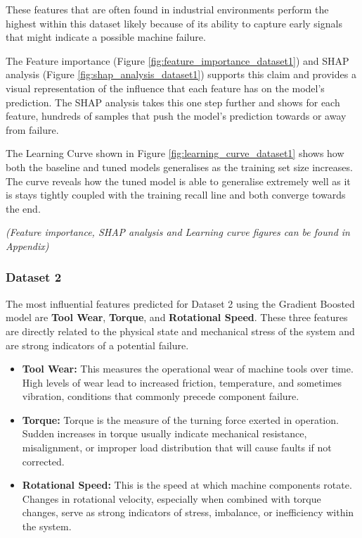 \documentclass[11pt]{article}
\begin{document}
These features that are often found in industrial environments perform the highest within this dataset likely because of its ability to capture early signals that might indicate a possible machine failure.

The Feature importance (Figure \ref{fig:feature_importance_dataset1}) and SHAP analysis (Figure \ref{fig:shap_analysis_dataset1}) supports this claim and provides a visual representation of the influence that each feature has on the model's prediction. The SHAP analysis takes this one step further and shows for each feature, hundreds of samples that push the model's prediction towards or away from failure. 

The Learning Curve shown in Figure \ref{fig:learning_curve_dataset1} shows how both the baseline and tuned models generalises as the training set size increases. The curve reveals how the tuned model is able to generalise extremely well as it is stays tightly coupled with the training recall line and both converge towards the end.

\textit{(Feature importance, SHAP analysis and Learning curve figures can be found in Appendix)}


\subsubsection{Dataset 2}
The most influential features predicted for Dataset 2 using the Gradient Boosted model are \textbf{Tool Wear}, \textbf{Torque}, and \textbf{Rotational Speed}. These three features are directly related to the physical state and mechanical stress of the system and are strong indicators of a potential failure.

\begin{itemize}
    \item \textbf{Tool Wear:} This measures the operational wear of machine tools over time. High levels of wear lead to increased friction, temperature, and sometimes vibration, conditions that commonly precede component failure.
    \item \textbf{Torque:} Torque is the measure of the turning force exerted in operation. Sudden increases in torque usually indicate mechanical resistance, misalignment, or improper load distribution that will cause faults if not corrected.
    \item \textbf{Rotational Speed:} This is the speed at which machine components rotate. Changes in rotational velocity, especially when combined with torque changes, serve as strong indicators of stress, imbalance, or inefficiency within the system.
\end{itemize}
\end{document}
